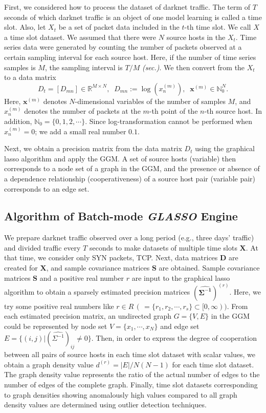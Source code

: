 \documentclass[conference]{IEEEtran}
\begin{document}
First, we considered how to process the dataset of darknet traffic.
The term of $T$ seconds of which darknet traffic is an object of one model learning is called a time slot.
Also, let $X_t$ be a set of packet data included in the $t$-th time slot.
We call $X$ a time slot dataset.
We assumed that there were $N$ source hosts in the $X_t$.
Time series data were generated by counting the number of packets observed at a certain sampling interval for each source host.
Here, if the number of time series samples is $M$, the sampling interval is $T/M$ \textit{(sec.)}.
We then convert from the $X_t$ to a data matrix
\begin{equation*}
D_t=[D_{mn}]\in\mathbb{R}^{M \times N},
\;\;D_{mn} := \log(x_n^{(m)}),
\;\;\bm{x}^{(m)}\in\mathbb{N}_0^{N}.
\end{equation*}
Here, $\bm{x}^{(m)}$ denotes $N$-dimensional variables of the number of samples $M$, and $x_n^{(m)}$ denotes the number of packets at the $m$-th point of the $n$-th source host.
In addition, $\mathbb{N}_0=\{0,1,2,\cdots\}$.
Since log-transformation cannot be performed when $x_n^{(m)}=0$; we add a small real number $0.1$.

Next, we obtain a precision matrix from the data matrix $D_t$ using the graphical lasso algorithm and apply the GGM.
A set of source hosts (variable) then corresponds to a node set of a graph in the GGM, and the presence or absence of a dependence relationship (cooperativeness) of a source host pair (variable pair) corresponds to an edge set.




\subsection{Algorithm of Batch-mode \textit{GLASSO} Engine}
\label{Batch}
We prepare darknet traffic observed over a long period (e.g., three days' traffic) and divided traffic every $T$ seconds to make datasets of multiple time slots $\bm{X}$.
At that time, we consider only SYN packets, TCP.
Next, data matrices $\bm{D}$ are created for $\bm{X}$, and sample covariance matrices $\bm{S}$ are obtained.
Sample covariance matrices $\bm{S}$ and a positive real number $r$ are input to the graphical lasso algorithm to obtain a sparsely estimated precision matrices ${(\bm{\hat{\Sigma^{-1}}})}^{(r)}$.
Here, we try some positive real numbers like $r \in R \, ( \, = \{r_1, r_2, \cdots, r_s\} \subset [0,\infty))$.
From each estimated precision matrix, an undirected graph $G = \{V, E\}$ in the GGM could be represented by node set $V=\{x_{1}, \cdots, x_{N}\}$ and edge set $E=\{(i,j)|{(\hat{\Sigma^{-1}})}_{ij}\neq0\}$.
Then, in order to express the degree of cooperation between all pairs of source hosts in each time slot dataset with scalar values, we obtain a graph density value $d^{(r)}=|E|/N(N-1)$ for each time slot dataset.
The graph density value represents the ratio of the actual number of edges to the number of edges of the complete graph.
Finally, time slot datasets corresponding to graph densities showing anomalously high values compared to all graph density values are determined using outlier detection techniques.
\end{document}
